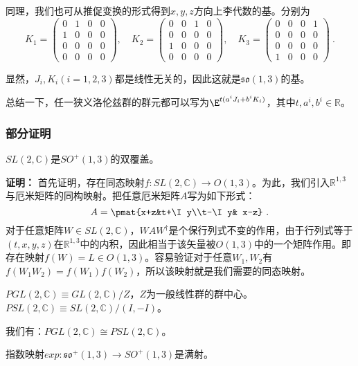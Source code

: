 同理，我们也可从推促变换的形式得到$x,y,z$方向上李代数的基。分别为
\begin{equation}
K_1=\begin{pmatrix}0&1&0&0\\1&0&0&0\\0&0&0&0\\0&0&0&0\end{pmatrix},\quad K_2=\begin{pmatrix}0&0&1&0\\0&0&0&0\\1&0&0&0\\0&0&0&0\end{pmatrix},\quad K_3=\begin{pmatrix}0&0&0&1\\0&0&0&0\\0&0&0&0\\1&0&0&0\end{pmatrix}~.
\end{equation}

显然，$J_i,K_i(i=1,2,3)$都是线性无关的，因此这就是$\mathfrak{so}(1,3)$的基。

总结一下，任一狭义洛伦兹群的群元都可以写为$\E^{t(a^iJ_i+b^iK_i)}$，其中$t,a^i,b^i\in\mathbb R$。
\subsubsection{部分证明}
\begin{theorem}{}
$SL(2,\mathbb C)$是$SO^+(1,3)$的双覆盖。
\end{theorem}
\textbf{证明：}
首先证明，存在同态映射$f:SL(2,\mathbb C)\to O(1,3)$。为此，我们引入$\mathbb R^{1,3}$与厄米矩阵的同构映射。把任意厄米矩阵$A$写为如下形式：
\begin{equation}
A=\pmat{x+z&t+\I y\\t-\I y& x-z}~.
\end{equation}
对于任意矩阵$W\in SL(2,\mathbb C)$，$WAW^{\dagger}$是个保行列式不变的作用，由于行列式等于$(t,x,y,z)$在$\mathbb R^{1,3}$中的内积，因此相当于该矢量被$O(1,3)$中的一个矩阵作用。即存在映射$f(W)=L\in O(1,3)$。容易验证对于任意$W_1,W_2$有$f(W_1W_2)=f(W_1)f(W_2)$，所以该映射就是我们需要的同态映射。



\begin{lemma}{}
$PGL(2,\mathbb C)\equiv GL(2,\mathbb C)/Z$，$Z$为一般线性群的群中心。$PSL(2,\mathbb C)\equiv SL(2,\mathbb C)/(I,-I)$。

我们有：$PGL(2,\mathbb C)\cong PSL(2,\mathbb C)$。
\end{lemma}
\begin{theorem}{}
指数映射$exp:\mathfrak {so}^+(1,3)\to SO^+(1,3)$是满射。
\end{theorem}



